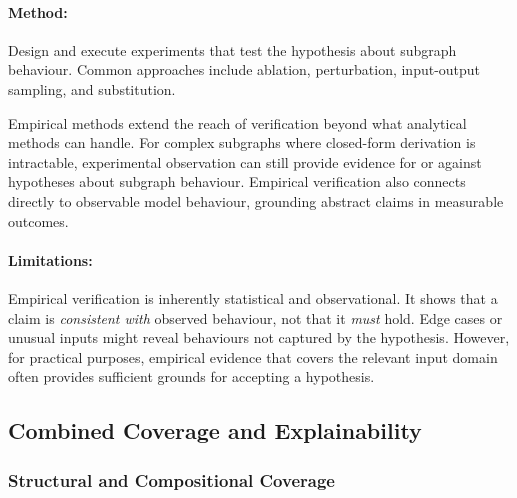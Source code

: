 \documentclass{article}
\begin{document}
\paragraph{Method:} Design and execute experiments that test the hypothesis about subgraph behaviour. Common approaches include ablation, perturbation, input-output sampling, and substitution.

Empirical methods extend the reach of verification beyond what analytical methods can handle. For complex subgraphs where closed-form derivation is intractable, experimental observation can still provide evidence for or against hypotheses about subgraph behaviour. Empirical verification also connects directly to observable model behaviour, grounding abstract claims in measurable outcomes.

\paragraph{Limitations:} Empirical verification is inherently statistical and observational. It shows that a claim is \emph{consistent with} observed behaviour, not that it \emph{must} hold. Edge cases or unusual inputs might reveal behaviours not captured by the hypothesis. However, for practical purposes, empirical evidence that covers the relevant input domain often provides sufficient grounds for accepting a hypothesis.


\subsection{Combined Coverage and Explainability}

\subsubsection{Structural and Compositional Coverage}
\end{document}
